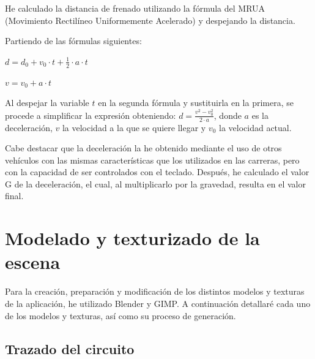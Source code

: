 \bigskip

He calculado la distancia de frenado utilizando la fórmula del MRUA (Movimiento Rectilíneo Uniformemente Acelerado) y despejando la distancia.

\bigskip

Partiendo de las fórmulas siguientes: 

$d = d_0 + v_0 \cdot t + \frac{1}{2} \cdot a \cdot t$

$v = v_0 + a \cdot t$

\bigskip

Al despejar la variable $t$ en la segunda fórmula y sustituirla en la primera, se procede a simplificar la expresión obteniendo: $ d = \frac{v^2-v_0^2}{2 \cdot a} $, donde $a$ es la deceleración, $v$ la velocidad a la que se quiere llegar y $v_0$ la velocidad actual.

\bigskip

Cabe destacar que la deceleración la he obtenido mediante el uso de otros vehículos con las mismas características que los utilizados en las carreras, pero con la capacidad de ser controlados con el teclado. Después, he calculado el valor G de la deceleración, el cual, al multiplicarlo por la gravedad, resulta en el valor final.

\newpage

\section{Modelado y texturizado de la escena}

Para la creación, preparación y modificación de los distintos modelos y texturas de la aplicación, he utilizado Blender\cite{blender} y GIMP\cite{gimp}. A continuación detallaré cada uno de los modelos y texturas, así como su proceso de generación.

\subsection{Trazado del circuito}

